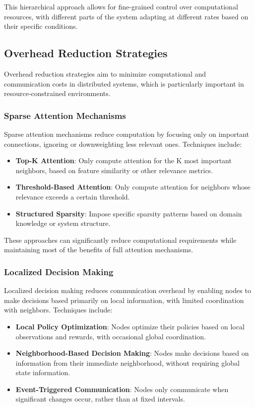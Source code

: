 \documentclass{article}
\begin{document}
This hierarchical approach allows for fine-grained control over computational resources, with different parts of the system adapting at different rates based on their specific conditions.

\subsection{Overhead Reduction Strategies}

Overhead reduction strategies aim to minimize computational and communication costs in distributed systems, which is particularly important in resource-constrained environments.

\subsubsection{Sparse Attention Mechanisms}

Sparse attention mechanisms reduce computation by focusing only on important connections, ignoring or downweighting less relevant ones. Techniques include:

\begin{itemize}
    \item \textbf{Top-K Attention}: Only compute attention for the K most important neighbors, based on feature similarity or other relevance metrics.
    
    \item \textbf{Threshold-Based Attention}: Only compute attention for neighbors whose relevance exceeds a certain threshold.
    
    \item \textbf{Structured Sparsity}: Impose specific sparsity patterns based on domain knowledge or system structure.
\end{itemize}

These approaches can significantly reduce computational requirements while maintaining most of the benefits of full attention mechanisms.

\subsubsection{Localized Decision Making}

Localized decision making reduces communication overhead by enabling nodes to make decisions based primarily on local information, with limited coordination with neighbors. Techniques include:

\begin{itemize}
    \item \textbf{Local Policy Optimization}: Nodes optimize their policies based on local observations and rewards, with occasional global coordination.
    
    \item \textbf{Neighborhood-Based Decision Making}: Nodes make decisions based on information from their immediate neighborhood, without requiring global state information.
    
    \item \textbf{Event-Triggered Communication}: Nodes only communicate when significant changes occur, rather than at fixed intervals.
\end{itemize}
\end{document}
